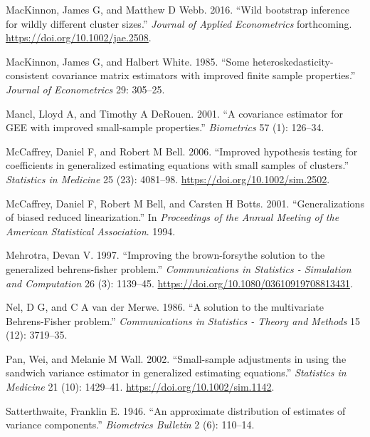 \documentclass[12pt]{article}
\newlength{\cslhangindent}
\newlength{\cslentryspacingunit} %
\newenvironment{CSLReferences}[2] %
 {%
  \setlength{\parindent}{0pt}
  \ifodd #1
  \let\oldpar\par
  \def\par{\hangindent=\cslhangindent\oldpar}
  \fi
  \setlength{\parskip}{#2\cslentryspacingunit}
 }%
 {}
\begin{document}
\begin{CSLReferences}{1}{0}
\leavevmode{}%
MacKinnon, James G, and Matthew D Webb. 2016. {``{Wild bootstrap
inference for wildly different cluster sizes}.''} \emph{Journal of
Applied Econometrics} forthcoming.
\url{https://doi.org/10.1002/jae.2508}.

\leavevmode{}%
MacKinnon, James G, and Halbert White. 1985. {``{Some
heteroskedasticity-consistent covariance matrix estimators with improved
finite sample properties}.''} \emph{Journal of Econometrics} 29:
305--25.

\leavevmode{}%
Mancl, Lloyd A, and Timothy A DeRouen. 2001. {``{A covariance estimator
for GEE with improved small-sample properties}.''} \emph{Biometrics} 57
(1): 126--34.

\leavevmode{}%
McCaffrey, Daniel F, and Robert M Bell. 2006. {``{Improved hypothesis
testing for coefficients in generalized estimating equations with small
samples of clusters.}''} \emph{Statistics in Medicine} 25 (23):
4081--98. \url{https://doi.org/10.1002/sim.2502}.

\leavevmode{}%
McCaffrey, Daniel F, Robert M Bell, and Carsten H Botts. 2001.
{``{Generalizations of biased reduced linearization}.''} In
\emph{Proceedings of the Annual Meeting of the American Statistical
Association}. 1994.

\leavevmode{}%
Mehrotra, Devan V. 1997. {``{Improving the brown-forsythe solution to
the generalized behrens-fisher problem}.''} \emph{Communications in
Statistics - Simulation and Computation} 26 (3): 1139--45.
\url{https://doi.org/10.1080/03610919708813431}.

\leavevmode{}%
Nel, D G, and C A van der Merwe. 1986. {``{A solution to the
multivariate Behrens-Fisher problem}.''} \emph{Communications in
Statistics - Theory and Methods} 15 (12): 3719--35.

\leavevmode{}%
Pan, Wei, and Melanie M Wall. 2002. {``{Small-sample adjustments in
using the sandwich variance estimator in generalized estimating
equations.}''} \emph{Statistics in Medicine} 21 (10): 1429--41.
\url{https://doi.org/10.1002/sim.1142}.

\leavevmode{}%
Satterthwaite, Franklin E. 1946. {``{An approximate distribution of
estimates of variance components}.''} \emph{Biometrics Bulletin} 2 (6):
110--14.


\end{CSLReferences}
\end{document}

